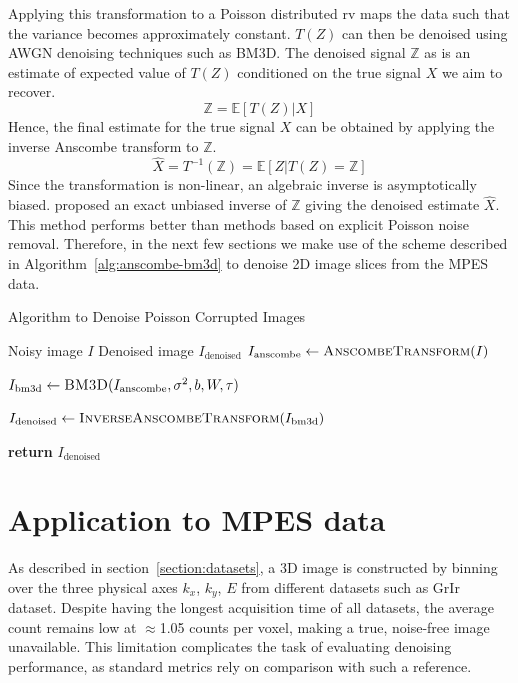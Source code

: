 Applying this transformation to a Poisson distributed \gls{rv} maps the data such that the variance becomes approximately constant. $T(Z)$ can then be denoised using \gls{AWGN} denoising techniques such as \gls{BM3D}. 
The denoised signal $\mathbb{Z}$ as is an estimate of expected value of $T(Z)$ conditioned on the true signal $X$ we aim to recover.
\begin{equation}
    \mathbb{Z} = \mathbb{E}[T(Z) | X]
\end{equation}
Hence, the final estimate for the true signal $X$ can be obtained by applying the inverse Anscombe transform to $\mathbb{Z}$.
\begin{equation}
    \hat{X} = T^{-1}(\mathbb{Z}) = \mathbb{E}[Z | T(Z) = \mathbb{Z}]
\end{equation}
Since the transformation is non-linear, an algebraic inverse is asymptotically biased. \citeauthor{makitaloOptimalInversionAnscombe2011} \cite{makitaloOptimalInversionAnscombe2011} proposed an exact unbiased inverse of $\mathbb{Z}$ giving the denoised estimate $\hat{X}$. This method performs better than methods based on explicit Poisson noise removal. Therefore, in the next few sections we make use of the scheme described in Algorithm~\ref{alg:anscombe-bm3d} to denoise 2D image slices from the \gls{MPES} data.

\begin{algorithm}
    \caption{Algorithm to Denoise Poisson Corrupted Images}\label{alg:anscombe-bm3d}
    \begin{algorithmic}[1]
    \Require Noisy image $I$
    \Ensure Denoised image $I_{\text{denoised}}$
    \Statex
        \State $I_{\text{anscombe}} \gets \textsc{AnscombeTransform}(I)$
        
        \State $I_{\text{bm3d}} \gets \textsc{BM3D}(I_{\text{anscombe}}, \sigma^2, b, W, \tau)$
        
        \State $I_{\text{denoised}} \gets \textsc{InverseAnscombeTransform}(I_{\text{bm3d}})$
        
        \State \textbf{return} $I_{\text{denoised}}$
    \EndProcedure
    \end{algorithmic}
\end{algorithm}

\section{Application to MPES data}
As described in section~\ref{section:datasets}, a 3D image is constructed by binning over the three physical axes $k_x$, $k_y$, $E$ from different datasets such as \gls{GrIr} dataset. Despite having the longest acquisition time of all datasets, the average count remains low at $\approx$1.05 counts per voxel, making a true, noise-free image unavailable. This limitation complicates the task of evaluating denoising performance, as standard metrics rely on comparison with such a reference.

